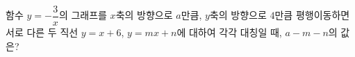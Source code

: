 함수 $y=-\dfrac{3}{x}$의 그래프를 $x$축의 방향으로 $a$만큼, $y$축의 방향으로 $4$만큼 평행이동하면 서로 다른 두 직선 $y=x+6$, $y=mx+n$에 대하여 각각 대칭일 때, $a-m-n$의 값은?
